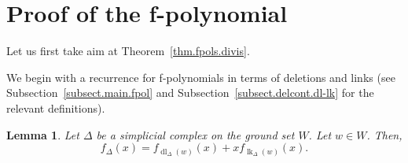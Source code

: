 \documentclass[12pt]{amsart}
\newtheorem{lemma}[theorem]{Lemma}
\theoremstyle{definition}
\DeclareMathOperator{\lk}{lk}
\DeclareMathOperator{\dl}{dl}
\newcommand{\tup}[1]{\left( #1 \right)}
\begin{document}
\section{\label{sect.fpol-proof1}Proof of the f-polynomial}

Let us first take aim at Theorem~\ref{thm.fpols.divis}.

We begin with a recurrence for f-polynomials in terms of
deletions and links
(see Subsection~\ref{subsect.main.fpol} and
Subsection~\ref{subsect.delcont.dl-lk} for the relevant definitions).

\begin{lemma} \label{lem.fpol.rec}
Let $\Delta$ be a simplicial complex on the ground set $W$.
Let $w \in W$. Then,
\[
f_{\Delta}\tup{x} = f_{\dl_\Delta(w)}\tup{x} + x f_{\lk_\Delta(w)}\tup{x} .
\]
\end{lemma}
\end{document}
